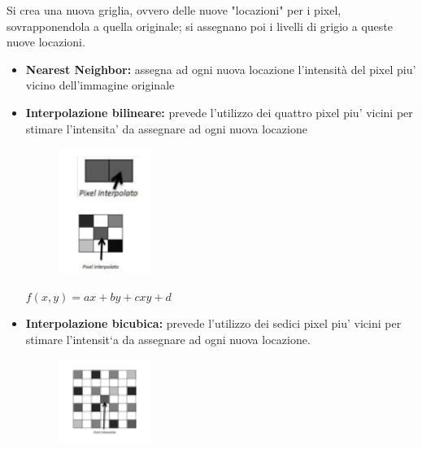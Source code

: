 Si crea una nuova griglia, ovvero delle nuove "locazioni" per i pixel, sovrapponendola a quella originale; si assegnano poi i livelli di
grigio a queste nuove locazioni.

\begin{itemize}
    \item \textbf{Nearest Neighbor:} assegna ad ogni nuova locazione l'intensità del pixel piu' vicino dell'immagine originale

    \item \textbf{Interpolazione bilineare:} prevede l'utilizzo dei quattro pixel piu' vicini per stimare l'intensita' da assegnare ad ogni nuova
          locazione

          \begin{figure}[H]
              \centering
              \includegraphics[width=3cm, keepaspectratio]{capitoli/immagini/imgs/esempio-interpolazione.png}
          \end{figure}

          \begin{center}
              $f(x,y)=ax+by+cxy+d$
          \end{center}

    \item \textbf{Interpolazione bicubica:} prevede l'utilizzo dei sedici pixel piu' vicini per stimare l'intensit`a
          da assegnare ad ogni nuova locazione.

          \begin{figure}[H]
              \centering
              \includegraphics[width=3cm, keepaspectratio]{capitoli/immagini/imgs/interpolazione-bicubica.png}
          \end{figure}

\end{itemize}


